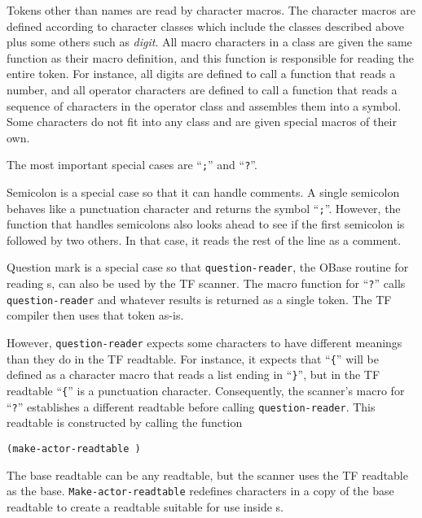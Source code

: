 Tokens other than names are read by character macros.  The character
macros are defined according to character classes which include
the classes described above plus some others such as {\em digit}.  All
macro characters in a class are given the same function as their macro
definition, and this function is responsible for reading the entire
token.  For instance, all digits are defined to call a function that
reads a number, and all operator characters are defined to call a
function that reads a sequence of characters in the operator class and
assembles them into a symbol.  Some characters do not fit into any
class and are given special macros of their own.

The most important special cases are ``{\tt ;}'' and ``{\tt ?}''.

Semicolon is a special case so that it can handle comments.
A single semicolon behaves like a punctuation character and
returns the symbol ``{\tt ;}''.  However, the function that
handles semicolons also looks ahead to see if the first
semicolon is followed by two others.  In that case, it reads
the rest of the line as a comment.

Question mark is a special case so that {\tt question-reader}, the
OBase routine for reading s, can also be used
by the TF scanner.  The macro function for ``{\tt ?}'' calls
{\tt question-reader} and whatever results is returned as a
single token.  The TF compiler then uses that token as-is.

However, {\tt question-reader} expects some characters to have
different meanings than they do in the TF readtable.  For instance,
it expects that ``\verb|{|'' will be defined as a character macro
that reads a list ending in ``\verb|}|'', but in the TF readtable
``\verb|{|'' is a punctuation character.  Consequently, the scanner's
macro for ``\verb|?|'' establishes a different readtable before
calling {\tt question-reader}.  This readtable is constructed by
calling the function

\begin{tabbing}
{\tt (make-actor-readtable )}
        \MapsTo {}
\end{tabbing}

The base readtable can be any readtable, but the scanner uses
the TF readtable as the base.  {\tt Make-actor-readtable}
redefines characters in a copy of the base readtable to create a
readtable suitable for use inside s.


